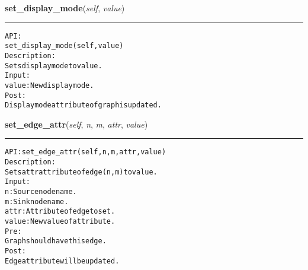     \label{coinor:gimpy:graph:Graph:set_display_mode}

    \vspace{0.5ex}

\hspace{.8\funcindent}\begin{boxedminipage}{\funcwidth}

    \raggedright \textbf{set\_display\_mode}(\textit{self}, \textit{value})

    \vspace{-1.5ex}

    \rule{\textwidth}{0.5\fboxrule}
\setlength{\parskip}{2ex}
\begin{alltt}

API:
    set\_display\_mode(self, value)
Description:
    Sets display mode to value.
Input:
    value: New display mode.
Post:
    Display mode attribute of graph is updated.
\end{alltt}

\setlength{\parskip}{1ex}
    \end{boxedminipage}

    \label{coinor:gimpy:graph:Graph:set_edge_attr}

    \vspace{0.5ex}

\hspace{.8\funcindent}\begin{boxedminipage}{\funcwidth}

    \raggedright \textbf{set\_edge\_attr}(\textit{self}, \textit{n}, \textit{m}, \textit{attr}, \textit{value})

    \vspace{-1.5ex}

    \rule{\textwidth}{0.5\fboxrule}
\setlength{\parskip}{2ex}
\begin{alltt}

API: set\_edge\_attr(self, n, m, attr, value)
Description:
Sets attr attribute of edge (n,m) to value.
Input:
    n: Source node name.
    m: Sink node name.
    attr: Attribute of edge to set.
    value: New value of attribute.
Pre:
    Graph should have this edge.
Post:
    Edge attribute will be updated.
\end{alltt}

\setlength{\parskip}{1ex}
    \end{boxedminipage}

